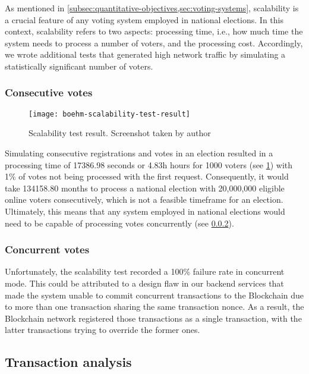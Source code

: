As mentioned in \cref{subsec:quantitative-objectives,sec:voting-systems}, scalability is a crucial feature of any voting system employed in national elections.
In this context, scalability refers to two aspects: processing time, i.e., how much time the system needs to process a number of voters, and the processing cost.
Accordingly, we wrote additional tests that generated high network traffic by simulating a statistically significant number of voters.


\subsubsection{Consecutive votes}\label{subsubsec:res-consecutive-votes}

\begin{figure}[h]
    \centering
    \texttt{[image: boehm-scalability-test-result]}
    \caption[Scalability test result]{Scalability test result. Screenshot taken by author}
    \label{fig:scalability-test-result}
\end{figure}

Simulating consecutive registrations and votes in an election resulted in a processing time of 17386.98 seconds or 4.83h hours for 1000 voters (see \cref{fig:scalability-test-result}) with 1\% of votes not being processed with the first request.
Consequently, it would take 134158.80 months to process a national election with 20,000,000 eligible online voters consecutively, which is not a feasible timeframe for an election.
Ultimately, this means that any system employed in national elections would need to be capable of processing votes concurrently (see \cref{subsubsec:res-concurrent-votes}).

\subsubsection{Concurrent votes}\label{subsubsec:res-concurrent-votes}

Unfortunately, the scalability test recorded a 100\% failure rate in concurrent mode.
This could be attributed to a design flaw in our backend services that made the system unable to commit concurrent transactions to the \gls{Blockchain} due to more than one transaction sharing the same transaction nonce.
As a result, the \gls{Blockchain} network registered those transactions as a single transaction, with the latter transactions trying to override the former ones.

\subsection{Transaction analysis}\label{subsec:res-transaction-analysis}

